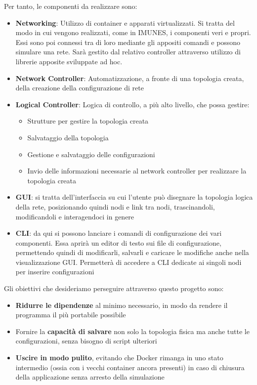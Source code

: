 Per tanto, le componenti da realizzare sono:
\begin{itemize}
    \item \textbf{Networking}: Utilizzo di container e apparati virtualizzati. Si tratta del modo in cui vengono realizzati, come in IMUNES, i componenti veri e propri. Essi sono poi connessi tra di loro mediante gli appositi comandi e possono simulare una rete. Sarà gestito dal relativo controller attraverso utilizzo di librerie apposite sviluppate ad hoc.
    \item \textbf{Network Controller}: Automatizzazione, a fronte di una topologia creata, della creazione della configurazione di rete
    \item \textbf{Logical Controller}: Logica di controllo, a più alto livello, che possa gestire:
          \begin{itemize}
              \item Strutture per gestire la topologia creata
              \item Salvataggio della topologia
              \item Gestione e salvataggio delle configurazioni
              \item Invio delle informazioni necessarie al network controller per realizzare la topologia creata
          \end{itemize}
    \item \textbf{GUI}: si tratta dell'interfaccia su cui l'utente può disegnare la topologia logica della rete, posizionando quindi nodi e link tra nodi, trascinandoli, modificandoli e interagendoci in genere
    \item \textbf{CLI}: da qui si possono lanciare i comandi di configurazione dei vari componenti. Essa aprirà un editor di testo sui file di configurazione, permettendo quindi di modificarli, salvarli e caricare le modifiche anche nella visualizzazione GUI. Permetterà di accedere a CLI dedicate ai singoli nodi per inserire configurazioni
\end{itemize}
Gli obiettivi che desideriamo perseguire attraverso questo progetto sono:
\begin{itemize}
    \item \textbf{Ridurre le dipendenze} al minimo necessario, in modo da rendere il programma il più portabile possibile
    \item Fornire la \textbf{capacità di salvare} non solo la topologia fisica ma anche tutte le configurazioni, senza bisogno di script ulteriori
    \item \textbf{Uscire in modo pulito}, evitando che Docker rimanga in uno stato intermedio (ossia con i vecchi container ancora presenti) in caso di chiusura della applicazione senza arresto della simulazione
\end{itemize}



\newpage

